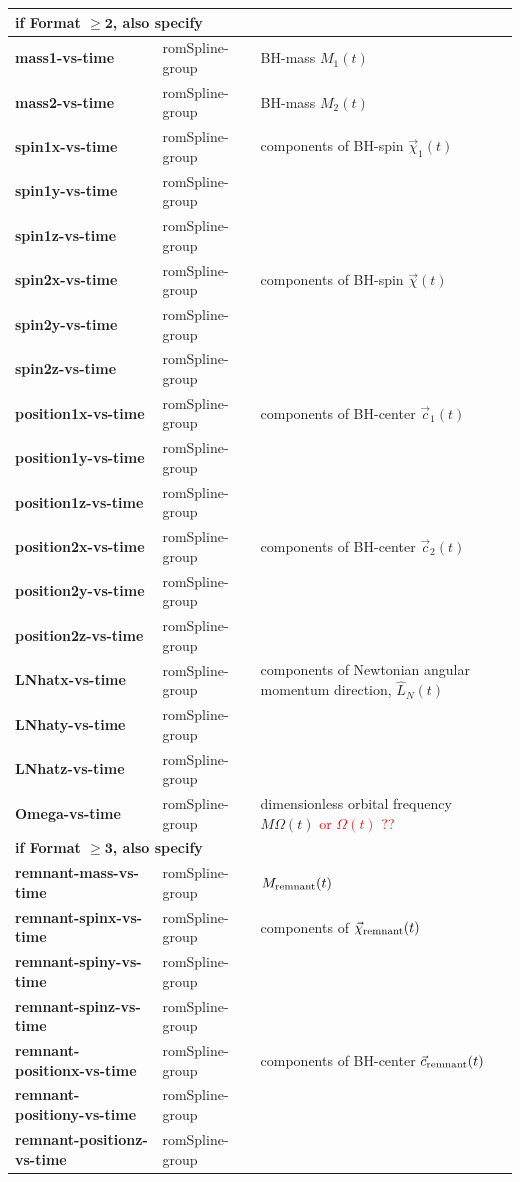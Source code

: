 \documentclass[11pt,tightenlines,article,amssymb,amsmath,amsfonts,superscriptaddress,nofootinbib]{revtex4}
\newcommand{\red}{\textcolor{red}}
\begin{document}
\begin{longtable}{|p{4cm}|p{2.5cm}|p{9.6cm}|}
\multicolumn{3}{|l|}{
  \rule[-.7em]{0pt}{2em}
       {\bf if Format \boldmath $\mathbf{\ge 2}$, also specify}}\\ \hline
\textbf{mass1-vs-time} & romSpline-group & BH-mass $M_1(t)$ \\
\textbf{mass2-vs-time} & romSpline-group & BH-mass $M_2(t)$ \\
\textbf{spin1x-vs-time} & romSpline-group & components of BH-spin $\vec\chi_1(t)$\\
\textbf{spin1y-vs-time} & romSpline-group & \\
\textbf{spin1z-vs-time} & romSpline-group & \\
\textbf{spin2x-vs-time} & romSpline-group & components of BH-spin $\vec\chi(t)$ \\
\textbf{spin2y-vs-time} & romSpline-group & \\
\textbf{spin2z-vs-time} & romSpline-group & \\
\textbf{position1x-vs-time} & romSpline-group & components of BH-center $\vec c_1(t)$ \\
\textbf{position1y-vs-time} & romSpline-group & \\
\textbf{position1z-vs-time} & romSpline-group & \\
\textbf{position2x-vs-time} & romSpline-group & components of BH-center $\vec c_2(t)$ \\
\textbf{position2y-vs-time} & romSpline-group & \\
\textbf{position2z-vs-time} & romSpline-group & \\
\textbf{LNhatx-vs-time} & romSpline-group & components of Newtonian angular momentum direction, $\hat L_N(t)$\\
\textbf{LNhaty-vs-time} & romSpline-group & \\
\textbf{LNhatz-vs-time} & romSpline-group & \\
\textbf{Omega-vs-time} & romSpline-group & dimensionless orbital frequency $M\Omega(t)$  \red{or $\Omega(t)$ ??}\\ 

\hline

\multicolumn{3}{|l|}{
  \rule[-.7em]{0pt}{2em}
       {\bf if Format \boldmath $\mathbf{\ge 3}$, also specify}}\\ \hline

\textbf{remnant-mass-vs-time} & romSpline-group &  $M_{\rm remnant}(t)$\\
\textbf{remnant-spinx-vs-time} & romSpline-group & components of $\vec\chi_{\rm remnant}(t)$\\
\textbf{remnant-spiny-vs-time} & romSpline-group & \\
\textbf{remnant-spinz-vs-time} & romSpline-group & \\
\textbf{remnant-positionx-vs-time} & romSpline-group & components of BH-center $\vec c_{\rm remnant}(t)$ \\
\textbf{remnant-positiony-vs-time} & romSpline-group &\\
\textbf{remnant-positionz-vs-time} & romSpline-group &

\end{longtable}
\end{document}
